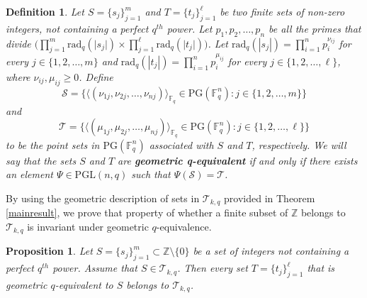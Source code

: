 \documentclass[12pt]{amsart}
\newtheorem{definition}{Definition}
\newtheorem{proposition}[theorem]{Proposition}
\newcommand{\F}{{\mathbb F}}
\newcommand{\Z}{{\mathbb Z}}
\newcommand{\fq}{{\mathbb F}_{q}}
\newcommand{\PG}{\mathrm{PG}}
\begin{document}
\begin{definition} \label{def:geometricqequiv}
Let $S = \{s_{j}\}_{j=1}^{m}$ and $T = \{t_{j}\}_{j=1}^{\ell}$ be two finite sets of non-zero integers, not containing a perfect $q^{th}$ power. Let $p_{1}, p_{2}, \ldots, p_{n}$ be all the primes that divide $\Big( \prod_{j=1}^{m} \text{rad}_{q}(\lvert s_{j} \rvert) \times \prod_{j=1}^{\ell}  \text{rad}_{q}(\lvert t_{j} \rvert) \Big)$. Let $ \text{rad}_{q}(|s_{j}|) = \prod_{i=1}^{n} p_{i}^{\nu_{ij}}$
for every $j\in\{1, 2, \ldots, m\}$ and $\text{rad}_{q}(|t_{j}|) = \prod\limits_{i=1}^{n} p_{i}^{\mu_{ij}}$ for every  $j \in\{1, 2, \ldots, \ell\}$, where $\nu_{ij}, \mu_{ij} \geq 0$. Define 
\[
\mathcal{S} = \big\{ \langle ( \nu_{1j}, \nu_{2j}, \ldots, \nu_{nj} )\rangle_{\fq} \in\PG(\F_{q}^{n}) : j\in\{1, 2, \ldots, m\} \big\} \]
and
\[ \mathcal{T} = \big\{\langle (\mu_{1j}, \mu_{2j}, \ldots, \mu_{nj} ) \rangle_{\fq} \in\PG(\F_{q}^{n}) : j\in\{1, 2, \ldots, \ell\} \big\}
\]
to be the point sets in $\PG(\mathbb{F}_{q}^{n})$ associated with $S$ and $T$, respectively. We will say that the sets $S$ and $T$ are \textbf{geometric q-equivalent} if and only if there exists an element $\Psi \in\mathrm{PGL}(n,q)$ such that $\Psi(\mathcal{S}) = \mathcal{T}$. 
\end{definition}


By using the geometric description of sets in $\mathcal{T}_{k,q}$ provided in Theorem \ref{mainresult}, we prove that property of whether a finite subset of $\mathbb{Z}$ belongs to $\mathcal{T}_{k,q}$ is invariant under geometric $q$-equivalence. 

\begin{proposition} \label{th:propertygeometricequiv}
    Let $S=\{s_j\}_{j=1}^{m} \subset \Z \setminus \{0\}$ be a set of integers not containing a perfect $q^{th}$ power. Assume that $S \in \mathcal{T}_{k,q}$. Then every set $T = \{t_{j}\}_{j=1}^{\ell}$ that is geometric $q$-equivalent to $S$ belongs to $\mathcal{T}_{k,q}$. 
\end{proposition}
\end{document}
